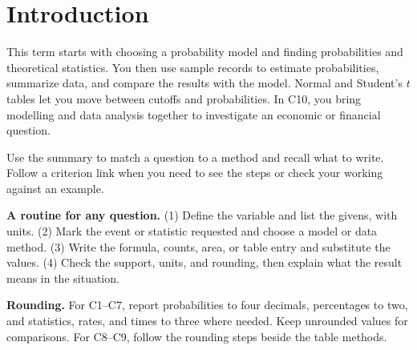 \setcounter{tocdepth}{1}
\label{toc}
\tableofcontents

\section{Introduction}
This term starts with choosing a probability model and finding probabilities and theoretical statistics. You then use sample records to estimate probabilities, summarize data, and compare the results with the model. Normal and Student's \(t\) tables let you move between cutoffs and probabilities. In C10, you bring modelling and data analysis together to investigate an economic or financial question.

Use the summary to match a question to a method and recall what to write. Follow a criterion link when you need to see the steps or check your working against an example.

\textbf{A routine for any question.} (1) Define the variable and list the givens, with units. (2) Mark the event or statistic requested and choose a model or data method. (3) Write the formula, counts, area, or table entry and substitute the values. (4) Check the support, units, and rounding, then explain what the result means in the situation.

\textbf{Rounding.} For C1--C7, report probabilities to four decimals, percentages to two, and statistics, rates, and times to three where needed. Keep unrounded values for comparisons. For C8--C9, follow the rounding steps beside the table methods.

\par\nobreak
\secInicio

\clearpage
